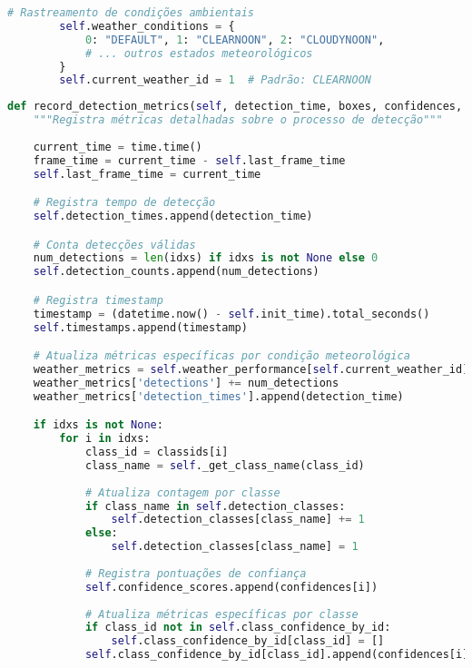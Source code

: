\documentclass[
	12pt,				%
	oneside, %
	a4paper,			%
	english,			%
	french,				%
	spanish,			%
	brazil				%
	]{abntex2}
\begin{document}
\begin{apendicesenv}
\begin{lstlisting}[language=Python, caption=Inicialização do sistema de métricas de desempenho., label=lst:metrics_init]
        # Rastreamento de condições ambientais
        self.weather_conditions = {
            0: "DEFAULT", 1: "CLEARNOON", 2: "CLOUDYNOON",
            # ... outros estados meteorológicos
        }
        self.current_weather_id = 1  # Padrão: CLEARNOON
\end{lstlisting}

\begin{lstlisting}[language=Python, caption=Método de registro de métricas de detecção., label=lst:record_detection_metrics]
def record_detection_metrics(self, detection_time, boxes, confidences, classids, idxs):
    """Registra métricas detalhadas sobre o processo de detecção"""
    
    current_time = time.time()
    frame_time = current_time - self.last_frame_time
    self.last_frame_time = current_time

    # Registra tempo de detecção
    self.detection_times.append(detection_time)

    # Conta detecções válidas
    num_detections = len(idxs) if idxs is not None else 0
    self.detection_counts.append(num_detections)

    # Registra timestamp
    timestamp = (datetime.now() - self.init_time).total_seconds()
    self.timestamps.append(timestamp)

    # Atualiza métricas específicas por condição meteorológica
    weather_metrics = self.weather_performance[self.current_weather_id]
    weather_metrics['detections'] += num_detections
    weather_metrics['detection_times'].append(detection_time)

    if idxs is not None:
        for i in idxs:
            class_id = classids[i]
            class_name = self._get_class_name(class_id)
            
            # Atualiza contagem por classe
            if class_name in self.detection_classes:
                self.detection_classes[class_name] += 1
            else:
                self.detection_classes[class_name] = 1
            
            # Registra pontuações de confiança
            self.confidence_scores.append(confidences[i])
            
            # Atualiza métricas específicas por classe
            if class_id not in self.class_confidence_by_id:
                self.class_confidence_by_id[class_id] = []
            self.class_confidence_by_id[class_id].append(confidences[i])
\end{lstlisting}


\end{apendicesenv}
\end{document}
